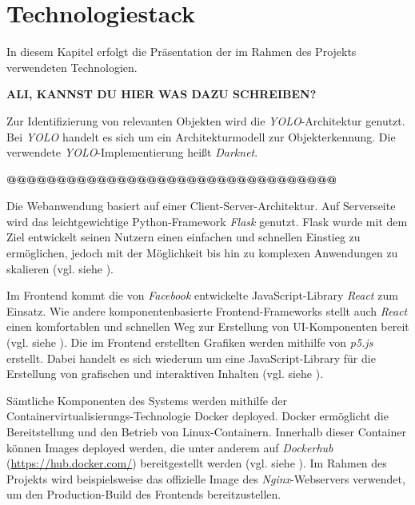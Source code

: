\section{Technologiestack}

In diesem Kapitel erfolgt die Präsentation der im Rahmen des Projekts verwendeten Technologien.

\textbf{ALI, KANNST DU HIER WAS DAZU SCHREIBEN?}

Zur Identifizierung von relevanten Objekten wird die \textit{YOLO}-Architektur genutzt.
Bei \textit{YOLO} handelt es sich um ein Architekturmodell zur Objekterkennung.
Die verwendete \textit{YOLO}-Implementierung heißt \textit{Darknet}. 

\textbf{@@@@@@@@@@@@@@@@@@@@@@@@@@@@@@@@@}

Die Webanwendung basiert auf einer Client-Server-Architektur.
Auf Serverseite wird das leichtgewichtige Python-Framework \textit{Flask} genutzt.
Flask wurde mit dem Ziel entwickelt seinen Nutzern einen einfachen und schnellen Einstieg zu ermöglichen, 
jedoch mit der Möglichkeit bis hin zu komplexen Anwendungen zu skalieren (vgl. siehe \cite{palletsprojects}). 

Im Frontend kommt die von \textit{Facebook} entwickelte JavaScript-Library \textit{React} zum Einsatz.
Wie andere komponentenbasierte Frontend-Frameworks stellt auch \textit{React} einen komfortablen und schnellen 
Weg zur Erstellung von UI-Komponenten bereit (vgl. siehe \cite{react.js}). 
Die im Frontend erstellten Grafiken werden mithilfe von \textit{p5.js} erstellt.
Dabei handelt es sich wiederum um eine JavaScript-Library für die Erstellung von grafischen und interaktiven
Inhalten (vgl. siehe \cite{p5.js}). 

Sämtliche Komponenten des Systems werden mithilfe der Container\-virtualisierungs-Technologie Docker deployed.
Docker ermöglicht die Bereitstellung und den Betrieb von Linux-Containern.
Innerhalb dieser Container können Images deployed werden, die unter anderem auf \textit{Dockerhub} (\url{https://hub.docker.com/}) 
bereitgestellt werden (vgl. siehe \cite{redhat-docker}).
Im Rahmen des Projekts wird beispielsweise das offizielle Image des \textit{Nginx}-Webservers verwendet, um den 
Production-Build des Frontends bereitzustellen. 



